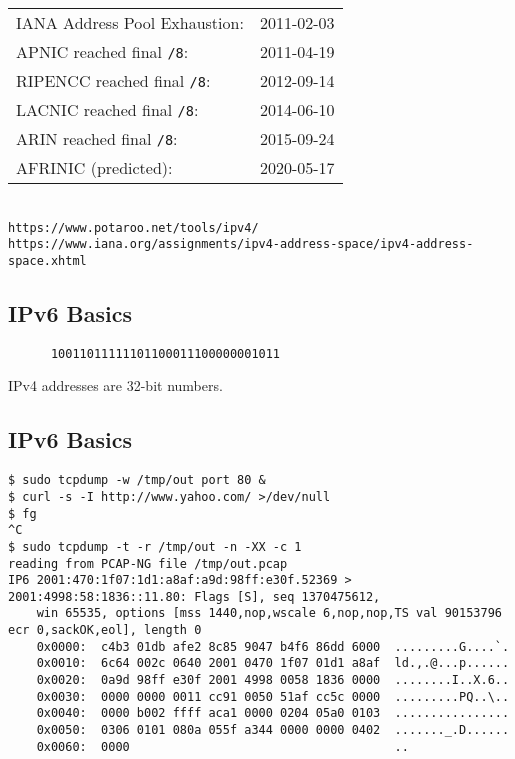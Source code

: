 \documentclass[xga]{xdvislides}
\begin{document}
\begin{tabular}{l r}
IANA Address Pool Exhaustion: & 2011-02-03 \\
APNIC reached final {\tt /8}: & 2011-04-19 \\
RIPENCC reached final {\tt /8}: & 2012-09-14 \\
LACNIC reached final {\tt /8}: & 2014-06-10 \\
ARIN reached final {\tt /8}: & 2015-09-24 \\
AFRINIC (predicted): & 2020-05-17 \\
\end{tabular}
\\

\vspace{.5in}
{\tt https://www.potaroo.net/tools/ipv4/} \\
{\tt https://www.iana.org/assignments/ipv4-address-space/ipv4-address-space.xhtml}

\subsection{IPv6 Basics}
\vspace{.5in}
\Hugesize
\begin{center}
\begin{verbatim}
      10011011111101100011100000001011
\end{verbatim}
\vspace{.5in}
IPv4 addresses are 32-bit numbers.
\end{center}
\Normalsize

\subsection{IPv6 Basics}
\begin{verbatim}
$ sudo tcpdump -w /tmp/out port 80 &
$ curl -s -I http://www.yahoo.com/ >/dev/null
$ fg
^C
$ sudo tcpdump -t -r /tmp/out -n -XX -c 1
reading from PCAP-NG file /tmp/out.pcap
IP6 2001:470:1f07:1d1:a8af:a9d:98ff:e30f.52369 > 2001:4998:58:1836::11.80: Flags [S], seq 1370475612,
    win 65535, options [mss 1440,nop,wscale 6,nop,nop,TS val 90153796 ecr 0,sackOK,eol], length 0
	0x0000:  c4b3 01db afe2 8c85 9047 b4f6 86dd 6000  .........G....`.
	0x0010:  6c64 002c 0640 2001 0470 1f07 01d1 a8af  ld.,.@...p......
	0x0020:  0a9d 98ff e30f 2001 4998 0058 1836 0000  ........I..X.6..
	0x0030:  0000 0000 0011 cc91 0050 51af cc5c 0000  .........PQ..\..
	0x0040:  0000 b002 ffff aca1 0000 0204 05a0 0103  ................
	0x0050:  0306 0101 080a 055f a344 0000 0000 0402  ......._.D......
	0x0060:  0000                                     ..
\end{verbatim}
\end{document}
